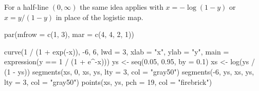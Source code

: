 \documentclass[
  letterpaper,
  DIV=11,
  numbers=noendperiod]{scrreprt}
\newenvironment{Shaded}{\begin{snugshade}}{\end{snugshade}}
\newcommand{\AttributeTok}[1]{\textcolor[rgb]{0.40,0.45,0.13}{#1}}
\newcommand{\DecValTok}[1]{\textcolor[rgb]{0.68,0.00,0.00}{#1}}
\newcommand{\FloatTok}[1]{\textcolor[rgb]{0.68,0.00,0.00}{#1}}
\newcommand{\FunctionTok}[1]{\textcolor[rgb]{0.28,0.35,0.67}{#1}}
\newcommand{\NormalTok}[1]{\textcolor[rgb]{0.00,0.23,0.31}{#1}}
\newcommand{\OtherTok}[1]{\textcolor[rgb]{0.00,0.23,0.31}{#1}}
\newcommand{\SpecialCharTok}[1]{\textcolor[rgb]{0.37,0.37,0.37}{#1}}
\newcommand{\StringTok}[1]{\textcolor[rgb]{0.13,0.47,0.30}{#1}}
\begin{document}
For a half-line \((0,\infty)\) the same idea applies with
\(x = -\log(1-y)\) or \(x = y/(1-y)\) in place of the logistic map.

\begin{Shaded}
\begin{Highlighting}[]
\FunctionTok{par}\NormalTok{(}\AttributeTok{mfrow =} \FunctionTok{c}\NormalTok{(}\DecValTok{1}\NormalTok{, }\DecValTok{3}\NormalTok{), }\AttributeTok{mar =} \FunctionTok{c}\NormalTok{(}\DecValTok{4}\NormalTok{, }\DecValTok{4}\NormalTok{, }\DecValTok{2}\NormalTok{, }\DecValTok{1}\NormalTok{))}

\FunctionTok{curve}\NormalTok{(}\DecValTok{1} \SpecialCharTok{/}\NormalTok{ (}\DecValTok{1} \SpecialCharTok{+} \FunctionTok{exp}\NormalTok{(}\SpecialCharTok{{-}}\NormalTok{x)), }\SpecialCharTok{{-}}\DecValTok{6}\NormalTok{, }\DecValTok{6}\NormalTok{, }\AttributeTok{lwd =} \DecValTok{3}\NormalTok{, }\AttributeTok{xlab =} \StringTok{"x"}\NormalTok{, }\AttributeTok{ylab =} \StringTok{"y"}\NormalTok{,}
      \AttributeTok{main =} \FunctionTok{expression}\NormalTok{(y }\SpecialCharTok{==} \DecValTok{1} \SpecialCharTok{/}\NormalTok{ (}\DecValTok{1} \SpecialCharTok{+}\NormalTok{ e}\SpecialCharTok{\^{}{-}}\NormalTok{x)))}
\NormalTok{ys }\OtherTok{\textless{}{-}} \FunctionTok{seq}\NormalTok{(}\FloatTok{0.05}\NormalTok{, }\FloatTok{0.95}\NormalTok{, }\AttributeTok{by =} \FloatTok{0.1}\NormalTok{)}
\NormalTok{xs }\OtherTok{\textless{}{-}} \FunctionTok{log}\NormalTok{(ys }\SpecialCharTok{/}\NormalTok{ (}\DecValTok{1} \SpecialCharTok{{-}}\NormalTok{ ys))}
\FunctionTok{segments}\NormalTok{(xs, }\DecValTok{0}\NormalTok{, xs, ys, }\AttributeTok{lty =} \DecValTok{3}\NormalTok{, }\AttributeTok{col =} \StringTok{"gray50"}\NormalTok{)}
\FunctionTok{segments}\NormalTok{(}\SpecialCharTok{{-}}\DecValTok{6}\NormalTok{, ys, xs, ys, }\AttributeTok{lty =} \DecValTok{3}\NormalTok{, }\AttributeTok{col =} \StringTok{"gray50"}\NormalTok{)}
\FunctionTok{points}\NormalTok{(xs, ys, }\AttributeTok{pch =} \DecValTok{19}\NormalTok{, }\AttributeTok{col =} \StringTok{"firebrick"}\NormalTok{)}


\end{Highlighting}
\end{Shaded}
\end{document}
